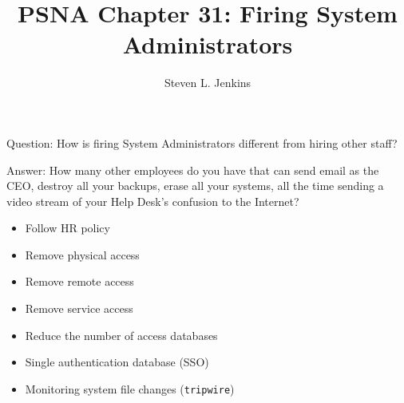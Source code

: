 \documentclass{slides}
\title{PSNA Chapter 31: Firing System Administrators}
\author{Steven L. Jenkins}
\newcommand{\bi}{\begin{itemize}}
\newcommand{\ei}{\end{itemize}}
\begin{document}

Question: How is firing System Administrators different from hiring 
other staff?

Answer: How many other employees do you have that can send email as
the CEO, destroy all your backups, erase all your systems, all the time
sending a video stream of your Help Desk's confusion to the Internet?


\bi
\item Follow HR policy
\item Remove physical access
\item Remove remote access
\item Remove service access
\item Reduce the number of access databases
\ei


\bi
\item Single authentication database (SSO)
\item Monitoring system file changes ({\tt tripwire})
\ei
\end{document}
